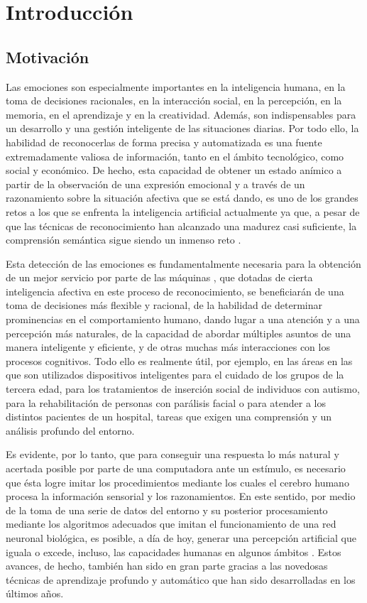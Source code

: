 \chapter{Introducción} \label{Chapter:1}

\section{Motivación}
Las emociones son especialmente importantes en la inteligencia humana, en la toma de decisiones racionales, en la interacción social, en la percepción, en la memoria, en el aprendizaje y en la creatividad. Además, son indispensables para un desarrollo y una gestión inteligente de las situaciones diarias. Por todo ello, la habilidad de reconocerlas de forma precisa y automatizada es una fuente extremadamente valiosa de información, tanto en el ámbito tecnológico, como social y económico. De hecho, esta capacidad de obtener un estado anímico a partir de la observación de una expresión emocional y a través de un razonamiento sobre la situación afectiva que se está dando, es uno de los grandes retos a los que se enfrenta la inteligencia artificial actualmente ya que, a pesar de que las técnicas de reconocimiento han alcanzado una madurez casi suficiente, la comprensión semántica sigue siendo un inmenso reto \cite{Bartneck}.

Esta detección de las emociones es fundamentalmente necesaria para la obtención de un mejor servicio por parte de las máquinas \cite{Picard}, que dotadas de cierta inteligencia afectiva en este proceso de reconocimiento, se beneficiarán de una toma de decisiones más flexible y racional, de la habilidad de determinar prominencias en el comportamiento humano, dando lugar a una atención y a una percepción más naturales, de la capacidad de abordar múltiples asuntos de una manera inteligente y eficiente, y de otras muchas más interacciones con los procesos cognitivos. Todo ello es realmente útil, por ejemplo, en las áreas en las que son utilizados dispositivos inteligentes para el cuidado de los grupos de la tercera edad, para los tratamientos de inserción social de individuos con autismo, para la rehabilitación de personas con parálisis facial o para atender a los distintos pacientes de un hospital, tareas que exigen una comprensión y un análisis profundo del entorno.

Es evidente, por lo tanto, que para conseguir una respuesta lo más natural y acertada posible por parte de una computadora ante un estímulo, es necesario que ésta logre imitar los procedimientos mediante los cuales el cerebro humano procesa la información sensorial y los razonamientos. En este sentido, por medio de la toma de una serie de datos del entorno y su posterior procesamiento mediante los algoritmos adecuados que imitan el funcionamiento de una red neuronal biológica, es posible, a día de hoy, generar una percepción artificial que iguala o excede, incluso, las capacidades humanas en algunos ámbitos \cite{AIreport}. Estos avances, de hecho, también han sido en gran parte gracias a las novedosas técnicas de aprendizaje profundo y automático que han sido desarrolladas en los últimos años.

